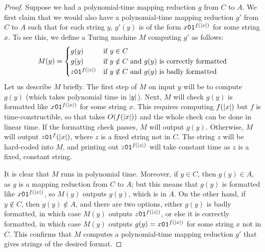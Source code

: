 \documentclass[11pt,twoside=off,numbers=noenddot]{scrbook}
\begin{document}
\begin{proof}
  Suppose we had a polynomial-time mapping reduction $g$ from $C$ to $A$. We first claim that we would also have a polynomial-time mapping reduction $g'$ from $C$ to $A$ such that for each string $y$, $g'(y)$ is of the form $x\texttt{0}\texttt{1}^{f(| x |)}$ for some string $x$. To see this, we define a Turing machine $M$ computing $g'$ as follows:
  \begin{align*}
    M(y) =
    \begin{cases}
      g(y) & \text{if $y \in C$} \\
      g(y) & \text{if $y \notin C$ and $g(y)$ is correctly formatted} \\
      z\texttt{0}\texttt{1}^{f(| z |)} & \text{if $y \notin C$ and $g(y)$ is badly formatted}
    \end{cases}
  \end{align*}
  Let us describe $M$ briefly. The first step of $M$ on input $y$ will be to compute $g(y)$ (which takes polynomial time in $| y |$). Next, $M$ will check $g(y)$ is formatted like $x\texttt{0}\texttt{1}^{f(| x |)}$ for some string $x$. This requires computing $f(| x |)$ but $f$ is time-constructible, so that takes $O(f(| x |))$ and the whole check can be done in linear time. If the formatting check passes, $M$ will output $g(y)$. Otherwise, $M$ will output $z\texttt{0}\texttt{1}^f(| x |)$, where $z$ is a fixed string not in $C$. The string $z$ will be hard-coded into $M$, and printing out $z\texttt{0}\texttt{1}^{f(| z |)}$ will take constant time as $z$ is a fixed, constant string.

  It is clear that $M$ runs in polynomial time. Moreover, if $y \in C$, then $g(y) \in A$, as $g$ is a mapping reduction from $C$ to $A$; but this means that $g(y)$ is formatted like $x\texttt{0}\texttt{1}^{f(| x |)}$, so $M(y)$ outputs $g(y)$, which is in $A$. On the other hand, if $y \notin C$, then $g(y) \notin A$, and there are two options, either $g(y)$ is badly formatted, in which case $M(y)$ outputs $z\texttt{0}\texttt{1}^{f(| z |)}$, or else it is correctly formatted, in which case $M(y)$ outputs $g(y) = x\texttt{0}\texttt{1}^{f(| x |)}$ for some string $x$ not in $C$. This confirms that $M$ computes a polynomial-time mapping reduction $g'$ that gives strings of the desired format.


\end{proof}
\end{document}
